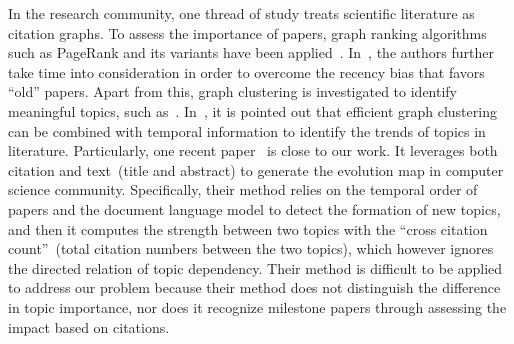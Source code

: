 In the research community, one thread of study treats scientific literature as
citation graphs. To assess the importance of papers, graph ranking algorithms
such as PageRank and its variants have been
applied~\cite{ghosh2011time,radev2009acl,sayyadi2009futurerank,walker2007ranking}.
In~\cite{ghosh2011time}, the authors further take time into consideration in
order to overcome the recency bias that favors ``old'' papers. Apart from this,
graph clustering is investigated to identify meaningful topics, such
as~\cite{bolelli2006clustering,flake2004graph,popescul2000clustering,
qazvinian2008scientific}. In~\cite{popescul2000clustering}, it is pointed out
that efficient graph clustering can be combined with temporal information to
identify the trends of topics in literature.  Particularly, one recent
paper~\cite{jo2011web} is close to our work. It leverages both citation and
text~(title and abstract) to generate the evolution map in computer science
community. Specifically, their method relies on the temporal order of papers and
the document language model to detect the formation of new topics, and then it
computes the strength between two topics with the ``cross citation
count''~(total citation numbers between the two topics), which however ignores
the directed relation of topic dependency.  Their method is difficult to be
applied to address our problem because their method does not distinguish the
difference in topic importance, nor does it recognize milestone papers through
assessing the impact based on citations.


